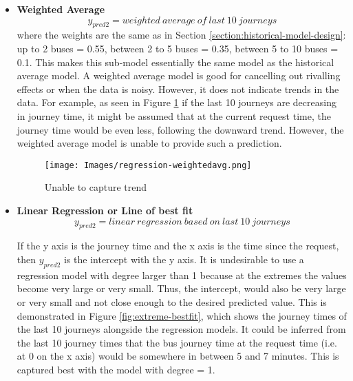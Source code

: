 \begin{itemize}
    \item \textbf{Weighted Average}
    \begin{equation}
        y_{pred2} = weighted\ average\ of\ last\ 10\ journeys
    \end{equation}
    where the weights are the same as in Section \ref{section:historical-model-design}: up to 2 buses = 0.55, between 2 to 5 buses = 0.35, between 5 to 10 buses = 0.1. This makes this sub-model essentially the same model as the historical average model. A weighted average model is good for cancelling out rivalling effects or when the data is noisy. However, it does not indicate trends in the data. For example, as seen in Figure \ref{fig:weighted-avg-regression} if the last 10 journeys are decreasing in journey time, it might be assumed that at the current request time, the journey time would be even less, following the downward trend. However, the weighted average model is unable to provide such a prediction.
    
    \begin{figure}[H]
    \begin{center}
        \texttt{[image: Images/regression-weightedavg.png]}
        \caption{Unable to capture trend}
        \label{fig:weighted-avg-regression}
    \end{center}
    \end{figure}
    
    \item \textbf{Linear Regression or Line of best fit}
    \begin{equation}
        y_{pred2} = linear\ regression\ based\ on\ last\ 10\ journeys
    \end{equation}
    
    If the y axis is the journey time and the x axis is the time since the request, then $y_{pred2}$ is the intercept with the y axis. It is undesirable to use a regression model with degree larger than 1 because at the extremes the values become very large or very small. Thus, the intercept, would also be very large or very small and not close enough to the desired predicted value. This is demonstrated in Figure \ref{fig:extreme-bestfit}, which shows the journey times of the last 10 journeys alongside the regression models. It could be inferred from the last 10 journey times that the bus journey time at the request time (i.e. at 0 on the x axis) would be somewhere in between 5 and 7 minutes. This is captured best with the model with degree = 1.
    

\end{itemize}
